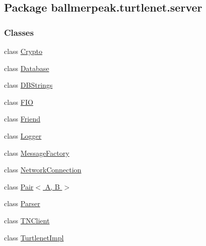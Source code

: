 \hypertarget{namespaceballmerpeak_1_1turtlenet_1_1server}{\subsection{Package ballmerpeak.\-turtlenet.\-server}
\label{namespaceballmerpeak_1_1turtlenet_1_1server}
}
\subsubsection*{Classes}
\begin{DoxyCompactItemize}
\item 
class \hyperlink{classballmerpeak_1_1turtlenet_1_1server_1_1Crypto}{Crypto}
\item 
class \hyperlink{classballmerpeak_1_1turtlenet_1_1server_1_1Database}{Database}
\item 
class \hyperlink{classballmerpeak_1_1turtlenet_1_1server_1_1DBStrings}{D\-B\-Strings}
\item 
class \hyperlink{classballmerpeak_1_1turtlenet_1_1server_1_1FIO}{F\-I\-O}
\item 
class \hyperlink{classballmerpeak_1_1turtlenet_1_1server_1_1Friend}{Friend}
\item 
class \hyperlink{classballmerpeak_1_1turtlenet_1_1server_1_1Logger}{Logger}
\item 
class \hyperlink{classballmerpeak_1_1turtlenet_1_1server_1_1MessageFactory}{Message\-Factory}
\item 
class \hyperlink{classballmerpeak_1_1turtlenet_1_1server_1_1NetworkConnection}{Network\-Connection}
\item 
class \hyperlink{classballmerpeak_1_1turtlenet_1_1server_1_1Pair_3_01A_00_01B_01_4}{Pair$<$ A, B $>$}
\item 
class \hyperlink{classballmerpeak_1_1turtlenet_1_1server_1_1Parser}{Parser}
\item 
class \hyperlink{classballmerpeak_1_1turtlenet_1_1server_1_1TNClient}{T\-N\-Client}
\item 
class \hyperlink{classballmerpeak_1_1turtlenet_1_1server_1_1TurtlenetImpl}{Turtlenet\-Impl}
\end{DoxyCompactItemize}

